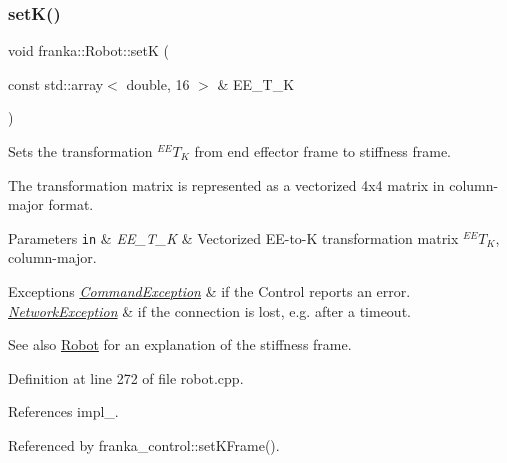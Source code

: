 \subsubsection{\texorpdfstring{set\+K()}{setK()}}
{\footnotesize\ttfamily void franka\+::\+Robot\+::setK (\begin{DoxyParamCaption}\item[{const std\+::array$<$ double, 16 $>$ \&}]{E\+E\+\_\+\+T\+\_\+K }\end{DoxyParamCaption})}

Sets the transformation $^{EE}T_K$ from end effector frame to stiffness frame.

The transformation matrix is represented as a vectorized 4x4 matrix in column-\/major format.


\begin{DoxyParams}[1]{Parameters}
\mbox{\tt in}  & {\em E\+E\+\_\+\+T\+\_\+K} & Vectorized E\+E-\/to-\/K transformation matrix $^{EE}T_K$, column-\/major.\\
\hline
\end{DoxyParams}

\begin{DoxyExceptions}{Exceptions}
{\em \hyperlink{structfranka_1_1CommandException}{Command\+Exception}} & if the Control reports an error. \\
\hline
{\em \hyperlink{structfranka_1_1NetworkException}{Network\+Exception}} & if the connection is lost, e.\+g. after a timeout.\\
\hline
\end{DoxyExceptions}
\begin{DoxySeeAlso}{See also}
\hyperlink{classfranka_1_1Robot}{Robot} for an explanation of the stiffness frame. 
\end{DoxySeeAlso}


Definition at line 272 of file robot.\+cpp.



References impl\+\_\+.



Referenced by franka\+\_\+control\+::set\+K\+Frame().


